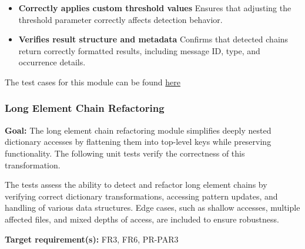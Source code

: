 \documentclass[12pt, titlepage]{article}
\begin{document}
\begin{itemize}
\item \textbf{Correctly applies custom threshold values} \newline
Ensures that adjusting the threshold parameter correctly affects detection behavior.

\item \textbf{Verifies result structure and metadata} \newline
Confirms that detected chains return correctly formatted results, including message ID, type, and occurrence details.
\end{itemize}

\noindent The test cases for this module can be found \href{https://github.com/ssm-lab/capstone--source-code-optimizer/blob/new-poc/tests/analyzers/test_detect_lec.py}{here}


\subsubsection{Long Element Chain Refactoring}

\textbf{Goal:} The long element chain refactoring module simplifies deeply nested dictionary accesses by flattening them into top-level keys while preserving functionality. The following unit tests verify the correctness of this transformation.

The tests assess the ability to detect and refactor long element chains by verifying correct dictionary transformations, accessing pattern updates, and handling of various data structures. Edge cases, such as shallow accesses, multiple affected files, and mixed depths of access, are included to ensure robustness.

\textbf{Target requirement(s):}  FR3, FR6, PR-PAR3 ~\cite{SRS} \\
\end{document}
